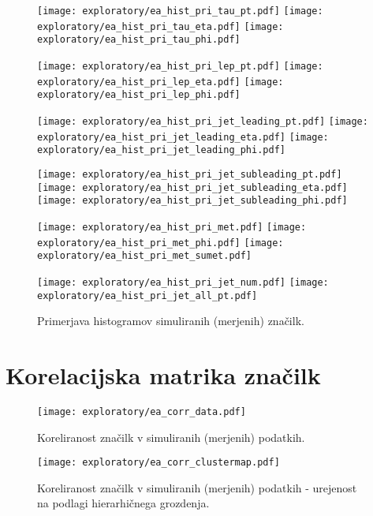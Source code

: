 \begin{figure}[ht]
	\label{hist_prim}

	\texttt{[image: exploratory/ea\_hist\_pri\_tau\_pt.pdf]}	
	\texttt{[image: exploratory/ea\_hist\_pri\_tau\_eta.pdf]}	
	\texttt{[image: exploratory/ea\_hist\_pri\_tau\_phi.pdf]}	
	
	\texttt{[image: exploratory/ea\_hist\_pri\_lep\_pt.pdf]}	
	\texttt{[image: exploratory/ea\_hist\_pri\_lep\_eta.pdf]}	
	\texttt{[image: exploratory/ea\_hist\_pri\_lep\_phi.pdf]}	
	
	\texttt{[image: exploratory/ea\_hist\_pri\_jet\_leading\_pt.pdf]}	
	\texttt{[image: exploratory/ea\_hist\_pri\_jet\_leading\_eta.pdf]}	
	\texttt{[image: exploratory/ea\_hist\_pri\_jet\_leading\_phi.pdf]}	
	
	\texttt{[image: exploratory/ea\_hist\_pri\_jet\_subleading\_pt.pdf]}	
	\texttt{[image: exploratory/ea\_hist\_pri\_jet\_subleading\_eta.pdf]}	
	\texttt{[image: exploratory/ea\_hist\_pri\_jet\_subleading\_phi.pdf]}
	
	
	\texttt{[image: exploratory/ea\_hist\_pri\_met.pdf]}	
	\texttt{[image: exploratory/ea\_hist\_pri\_met\_phi.pdf]}	
	\texttt{[image: exploratory/ea\_hist\_pri\_met\_sumet.pdf]}	
	
	\texttt{[image: exploratory/ea\_hist\_pri\_jet\_num.pdf]}	
	\texttt{[image: exploratory/ea\_hist\_pri\_jet\_all\_pt.pdf]}	

	\caption{Primerjava histogramov simuliranih (merjenih) značilk.}			
	
\end{figure}

\section{Korelacijska matrika značilk}

\begin{figure}[ht]
	\texttt{[image: exploratory/ea\_corr\_data.pdf]}
	\caption{Koreliranost značilk v simuliranih (merjenih) podatkih.}
	\label{corr_matrix}
\end{figure}

\begin{figure}[ht]
	\texttt{[image: exploratory/ea\_corr\_clustermap.pdf]}
	\caption{Koreliranost značilk v simuliranih (merjenih) podatkih - urejenost na podlagi hierarhičnega grozdenja.}
	\label{corr_clust_matrix}
\end{figure}

